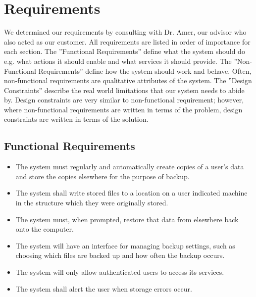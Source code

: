 \chapter {Requirements}

We determined our requirements by consulting with Dr. Amer, our advisor who also acted as our customer.  All requirements are listed in order of importance for each section.  The ''Functional Requirements'' define what the system should do e.g. what actions it should enable and what services it should provide.  The ''Non-Functional Requirements'' define how the system should work and behave.  Often, non-functional requirements are qualitative attributes of the system.  The ''Design Constraints'' describe the real world limitations that our system needs to abide by.  Design constraints are very similar to non-functional requirement; however, where non-functional requirements are written in terms of the problem, design constraints are written in terms of the solution.

\section {Functional Requirements}

	\begin{itemize}
		\item The system must regularly and automatically create copies of a user's data and store the copies elsewhere for the purpose of backup.

		\item The system shall write stored files to a location on a user indicated machine in the structure which they were originally stored.

		\item The system must, when prompted, restore that data from elsewhere back onto the computer.

		\item The system will have an interface for managing backup settings, such as choosing which files are backed up and how often the backup occurs.

		\item The system will only allow authenticated users to access its services.

		\item The system shall alert the user when storage errors occur.

	\end{itemize}

